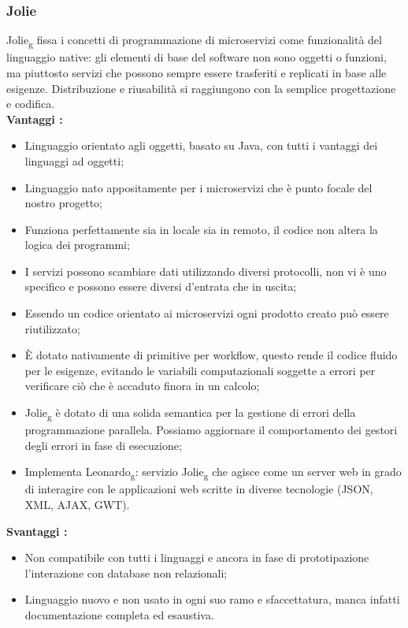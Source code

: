 {{		\subsubsection{Jolie}{
			Jolie\textsubscript{g} fissa i concetti di programmazione di microservizi come funzionalità del linguaggio native: gli elementi di base del software non sono oggetti o funzioni, ma piuttosto servizi che possono sempre essere trasferiti e replicati in base alle esigenze. Distribuzione e riusabilità si raggiungono con la semplice progettazione e codifica.\\
			\textbf{Vantaggi :}
			\begin{itemize}\itemsep1pt
				\item Linguaggio orientato agli oggetti, basato su Java, con tutti i vantaggi dei linguaggi ad oggetti;
				\item Linguaggio nato appositamente per i microservizi che è punto focale del nostro progetto;
				\item Funziona perfettamente sia in locale sia in remoto, il codice non altera la logica dei programmi;
				\item I servizi possono scambiare dati utilizzando diversi protocolli, non vi è uno specifico e possono essere diversi d'entrata che in uscita;
				\item Essendo un codice orientato ai microservizi ogni prodotto creato può essere riutilizzato;
				\item È dotato nativamente di primitive per workflow, questo rende il codice fluido per le esigenze, evitando le variabili computazionali soggette a errori per verificare ciò che è accaduto finora in un calcolo;
				\item Jolie\textsubscript{g} è dotato di una solida semantica per la gestione di errori della programmazione parallela. Possiamo  aggiornare il comportamento dei gestori degli errori in fase di esecuzione;
				\item Implementa Leonardo\textsubscript{g}: servizio Jolie\textsubscript{g} che agisce come un server web in grado di interagire con le applicazioni web scritte in diverse tecnologie (JSON, XML, AJAX, GWT). 
			\end{itemize}
			\textbf{Svantaggi :}
			\begin{itemize}\itemsep1pt
				\item Non compatibile con tutti i linguaggi e ancora in fase di prototipazione l'interazione con database non relazionali;
				\item Linguaggio nuovo e non usato in ogni suo ramo e sfaccettatura, manca infatti documentazione completa ed esaustiva.
			\end{itemize}
		}
}}
